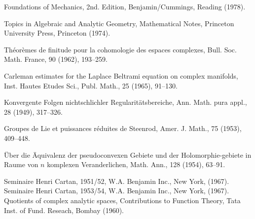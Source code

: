 \begin{sourcebibliography}
 Foundations of Mechanics, 2nd. Edition, Benjamin/Cummings, Reading (1978).
\end{sourcebibliography}
\begin{sourcebibliography}
 Topics in Algebraic and Analytic Geometry, Mathematical Notes, Princeton University Press, Princeton (1974).
\end{sourcebibliography}
\begin{sourcebibliography}
 Th\'eor\`emes de finitude pour la cohomologie des espaces complexes, Bull. Soc. Math. France, 90 (1962), 193--259.
\end{sourcebibliography}
\begin{sourcebibliography}
 Carleman estimates for the Laplace Beltrami equation on complex manifolds, Inst. Hautes Etudes Sci., Publ. Math., 25 (1965), 91--130.
\end{sourcebibliography}
\begin{sourcebibliography}
 Konvergente Folgen nichtschlichler Regularit\"atsbereiche, Ann. Math. pura appl., 28 (1949), 317--326.
\end{sourcebibliography}
\begin{sourcebibliography}
 Groupes de Lie et puissances r\'eduites de Steenrod, Amer. J. Math., 75 (1953), 409--448.
\end{sourcebibliography}
\begin{sourcebibliography}
 \"Uber die \"Aquivalenz der pseudoconvexen Gebiete und der Holomorphie-gebiete in Raume von $n$ komplexen Veranderlichen, Math. Ann., 128 (1954), 63--91.
\end{sourcebibliography}
\begin{sourcebibliography}
 Seminaire Henri Cartan, 1951/52, W.A. Benjamin Inc., New York, (1967).
 Seminaire Henri Cartan, 1953/54, W.A. Benjamin Inc., New York, (1967).
 Quotients of complex analytic spaces, Contributions to Function Theory, Tata Inst. of Fund. Reseach, Bombay (1960).
\end{sourcebibliography}
